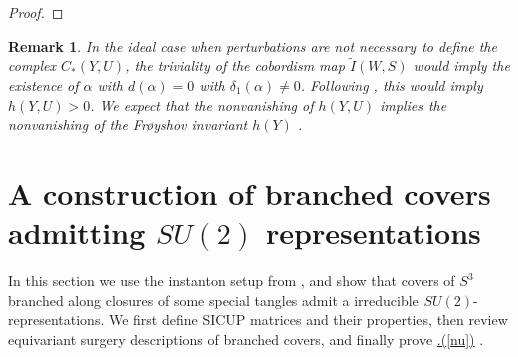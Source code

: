 \documentclass[11pt]{amsart}
\newtheorem{remark}[theorem]{Remark}
\newcommand{\Crefparts}[2]{%
  \hyperref[#2]{\Cref*{#1}.(\ref*{#2})}%
}
\newcommand\SU{\mathrm{SU}}
\begin{document}
\begin{proof}

\end{proof}

\begin{remark} In the ideal case when perturbations are not necessary to define the complex $C_*(Y,U)$, the triviality of the cobordism map $\tilde{I}(W,S)$ would imply the existence of $\alpha$ with $d(\alpha)=0$ with $\delta_1(\alpha) \neq 0$. Following \cite[Proposition 4.15]{DS-singular}, this would imply $h(Y, U)>0$. We expect that the nonvanishing of $h(Y, U)$ implies the nonvanishing of the Fr\o yshov invariant $h(Y)$ \cite[Definition 3]{Froyshov-h}.
\end{remark}


\section{A construction of branched covers admitting $SU(2)$ representations}\label{sicup}
In this section we use the instanton setup from , and show that covers of $S^3$ branched along closures of some special tangles admit a irreducible $SU(2)$-representations. We first define SICUP matrices and their properties, then review equivariant surgery descriptions of branched covers, and finally prove \Crefparts{mainthm}{nu}. 
\end{document}
